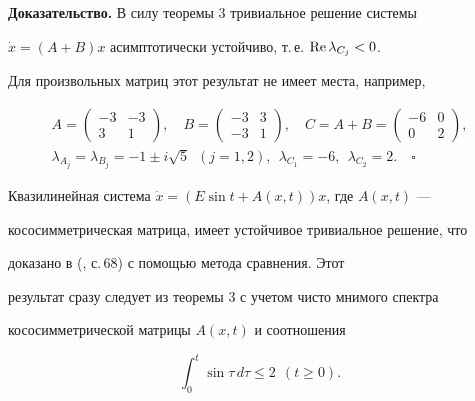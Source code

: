 {\bf Доказательство.} В силу теоремы 3 тривиальное решение системы 


$\Dot x=(A+B)x$ асимптотически устойчиво, т.\,е. $\operatorname{Re}\lambda_{C_j}<0$.





Для произвольных матриц этот результат не имеет места, например,


\begin{gather*}


A=


\begin{pmatrix}


-3 & -3 \\ 3 & 1


\end{pmatrix}


,\quad B=


\begin{pmatrix}


-3 & 3 \\ -3 & 1


\end{pmatrix}


,\quad C=A+B=


\begin{pmatrix}


-6 & 0 \\ 0 & 2


\end{pmatrix}


, \\


\lambda_{A_j}=\lambda_{B_j}=-1\pm i\sqrt{5}\ \; (j=1,2),


\ \ \lambda_{C_1}=-6,\ \ \lambda_{C_2}=2.\quad\square


\end{gather*}





\begin{exam}


Квазилинейная система $\Dot x=(E\sin t+A(x,t))x$, где $A(x,t)$ --- 


кососимметрическая матрица, имеет устойчивое тривиальное решение, что 


доказано в (\cite{4}, с.\,68) с помощью метода сравнения. Этот 


результат сразу следует из теоремы 3 с учетом чисто мнимого спектра 


кососимметрической матрицы $A(x,t)$ и соотношения


$$


\int^t_0 \sin\tau\,d\tau\le2\ \ (t\ge0).


$$


\end{exam}





